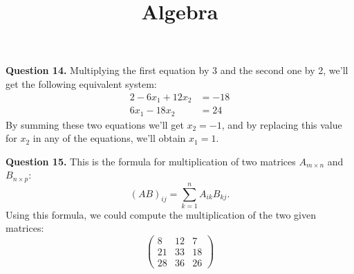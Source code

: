 \documentclass{ximera}
\title{Algebra}
\begin{document}
\maketitle

\textbf{Question 14.} Multiplying the first equation by 3 and the second one by 2, we'll get the following equivalent system:
\begin{alignat*}{2}
 -6  x_1  + 12  x_2 & = -18 \\
 6  x_1  - 18  x_2 & = 24
\end{alignat*}
By summing these two equations we'll get $x_2 = -1$, and by replacing this value for $x_2$ in any of the equations, we'll obtain $x_1 = 1$.

\textbf{Question 15.} This is the formula for multiplication of two matrices $A_{m \times n}$ and $B_{n \times p}$:
\begin{equation*}
    (AB)_{ij} = \sum_{k=1}^n A_{ik}B_{kj}. 
\end{equation*}
Using this formula, we could compute the multiplication of the two given matrices:
\begin{equation*}
\begin{pmatrix}
8 & 12 & 7 \\
21 & 33 & 18 \\
28 & 36 & 26
\end{pmatrix}
\end{equation*}
\end{document}
